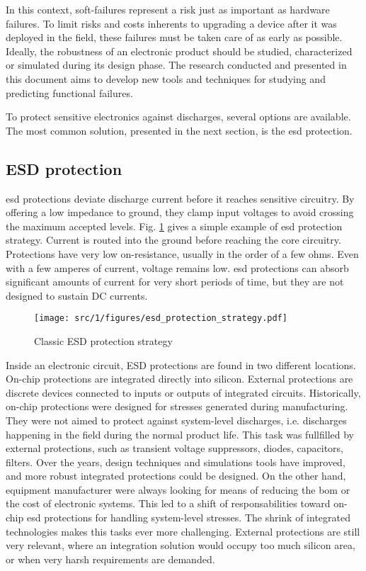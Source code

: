 In this context, soft-failures represent a risk just as important as hardware failures.
To limit risks and costs inherents to upgrading a device after it was deployed in the field, these failures must be taken care of as early as possible.
Ideally, the robustness of an electronic product should be studied, characterized or simulated during its design phase.
The research conducted and presented in this document aims to develop new tools and techniques for studying and predicting functional failures.

To protect sensitive electronics against discharges, several options are available.
The most common solution, presented in the next section, is the \gls{esd} protection.

\subsection{ESD protection}

\gls{esd} protections deviate discharge current before it reaches sensitive circuitry.
By offering a low impedance to ground, they clamp input voltages to avoid crossing the maximum accepted levels.
Fig. \ref{fig:esd-protection-strategy} gives a simple example of \gls{esd} protection strategy.
Current is routed into the ground before reaching the core circuitry.
Protections have very low on-resistance, usually in the order of a few ohms.
Even with a few amperes of current, voltage remains low.
\gls{esd} protections can absorb significant amounts of current for very short periods of time, but they are not designed to sustain DC currents.

\begin{figure}[!h]
  \centering
  \texttt{[image: src/1/figures/esd\_protection\_strategy.pdf]}
  \caption{Classic ESD protection strategy}
  \label{fig:esd-protection-strategy}
\end{figure}

Inside an electronic circuit, ESD protections are found in two different locations.
On-chip protections are integrated directly into silicon.
External protections are discrete devices connected to inputs or outputs of integrated circuits.
Historically, on-chip protections were designed for stresses generated during manufacturing.
They were not aimed to protect against system-level discharges, i.e. discharges happening in the field during the normal product life.
This task was fullfilled by external protections, such as transient voltage suppressors, diodes, capacitors, filters.
Over the years, design techniques and simulations tools have improved, and more robust integrated protections could be designed.
On the other hand, equipment manufacturer were always looking for means of reducing the \gls{bom} or the cost of electronic systems.
This led to a shift of responsabilities toward on-chip \gls{esd} protections for handling system-level stresses.
The shrink of integrated technologies makes this tasks ever more challenging.
External protections are still very relevant, where an integration solution would occupy too much silicon area, or when very harsh requirements are demanded.

